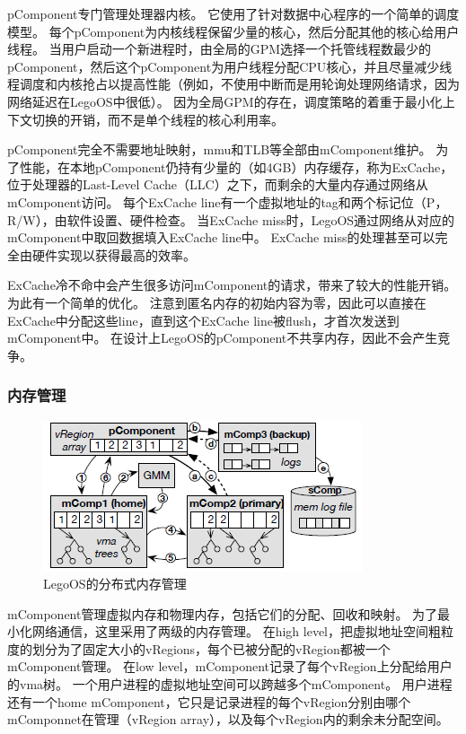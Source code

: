 pComponent专门管理处理器内核。
它使用了针对数据中心程序的一个简单的调度模型。
每个pComponent为内核线程保留少量的核心，然后分配其他的核心给用户线程。
当用户启动一个新进程时，由全局的GPM选择一个托管线程数最少的pComponent，然后这个pComponent为用户线程分配CPU核心，并且尽量减少线程调度和内核抢占以提高性能（例如，不使用中断而是用轮询处理网络请求，因为网络延迟在LegoOS中很低）。
因为全局GPM的存在，调度策略的着重于最小化上下文切换的开销，而不是单个线程的核心利用率。

pComponent完全不需要地址映射，mmu和TLB等全部由mComponent维护。
为了性能，在本地pComponent仍持有少量的（如4GB）内存缓存，称为ExCache，位于处理器的Last-Level Cache（LLC）之下，而剩余的大量内存通过网络从mComponent访问。
每个ExCache line有一个虚拟地址的tag和两个标记位（P，R/W），由软件设置、硬件检查。
当ExCache miss时，LegoOS通过网络从对应的mComponent中取回数据填入ExCache line中。
ExCache miss的处理甚至可以完全由硬件实现以获得最高的效率。

ExCache冷不命中会产生很多访问mComponent的请求，带来了较大的性能开销。
为此有一个简单的优化。
注意到匿名内存的初始内容为零，因此可以直接在ExCache中分配这些line，直到这个ExCache line被flush，才首次发送到mComponent中。
在设计上LegoOS的pComponent不共享内存，因此不会产生竞争。

\subsubsection{内存管理}

\begin{figure}[h]
\centering
\includegraphics[scale=1.00]{Figures/system/memory_management.png}
\decoRule
\caption{LegoOS的分布式内存管理}    %
\label{fig:legoos_memory_management}
\end{figure}

mComponent管理虚拟内存和物理内存，包括它们的分配、回收和映射。
为了最小化网络通信，这里采用了两级的内存管理。
在high level，把虚拟地址空间粗粒度的划分为了固定大小的vRegions，每个已被分配的vRegion都被一个mComponent管理。
在low level，mComponent记录了每个vRegion上分配给用户的vma树。
一个用户进程的虚拟地址空间可以跨越多个mComponent。
用户进程还有一个home mComponent，它只是记录进程的每个vRegion分别由哪个mComponnet在管理（vRegion array），以及每个vRegion内的剩余未分配空间。

